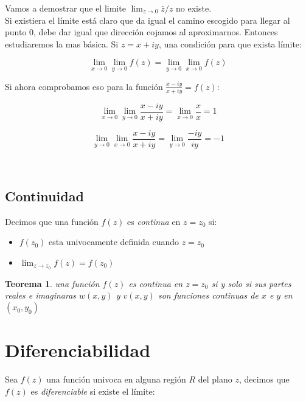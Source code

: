 \documentclass[12pt]{book}
\newtheorem{theorem}{Teorema}[section]
\begin{document}

\hrulefill

Vamos a demostrar que el limite  $\lim_{z \rightarrow 0} \bar{z}/z$ no existe. \\

Si existiera el límite está claro que da igual el camino escogido para llegar al punto 0, debe dar igual que dirección cojamos al aproximarnos. Entonces estudiaremos la mas básica. Si $z=x+iy$, una condición para que exista límite: 

\begin{equation}
\lim_{x \rightarrow 0} \lim_{y \rightarrow 0} f(z) = \lim_{y \rightarrow 0} \lim_{x \rightarrow 0} f(z)
\end{equation}

Si ahora comprobamos eso para la función $\frac{x-iy}{x+iy}=f(z)$:

$$ \lim_{x \rightarrow 0} \lim_{y \rightarrow 0} \frac{x-iy}{x+iy} = \lim_{x \rightarrow 0} \dfrac{x}{x} = 1 $$

$$ \lim_{y \rightarrow 0} \lim_{x \rightarrow 0} \frac{x-iy}{x+iy} =  \lim_{y \rightarrow 0} \frac{-iy}{iy} = -1 $$

\hrulefill \\


\subsection*{Continuidad}

Decimos que una función $f(z)$ es \textit{continua} en $z=z_0$ si:

\begin{itemize}
\item $f(z_0)$ esta univocamente definida cuando $z=z_0$

\item $\lim_{z \rightarrow z_0} f(z) = f(z_0)$
\end{itemize} 

\begin{theorem}
 una función $f(z)$ es continua en $z=z_0$ si y solo si sus partes reales e imaginaras $w(x,y)$ y $v(x,y)$ son funciones continuas de $x$ e $y$ en $(x_0,y_0)$
\end{theorem}

\section{Diferenciabilidad}

Sea $f(z)$ una función univoca en alguna región $R$ del plano $z$, decimos que $f(z)$ es \textit{diferenciable} si existe el límite:
\end{document}
